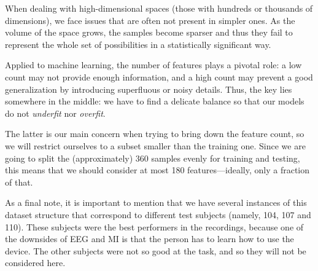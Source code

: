 	When dealing with high-dimensional spaces (those with hundreds or thousands of dimensions), we face issues that are often not present in simpler ones. As the volume of the space grows, the samples become sparser and thus they fail to represent the whole set of possibilities in a statistically significant way.

	Applied to machine learning, the number of features plays a pivotal role: a low count may not provide enough information, and a high count may prevent a good generalization by introducing superfluous or noisy details. Thus, the key lies somewhere in the middle: we have to find a delicate balance so that our models do not \textit{underfit} nor \textit{overfit}. 

\newpage

	The latter is our main concern when trying to bring down the feature count, so we will restrict ourselves to a subset smaller than the training one. Since we are going to split the (approximately) 360 samples evenly for training and testing, this means that we should consider at most 180 features---ideally, only a fraction of that.

	As a final note, it is important to mention that we have several instances of this dataset structure that correspond to different test subjects (namely, 104, 107 and 110). These subjects were the best performers in the recordings, because one of the downsides of \acs{EEG} and \acs{MI} is that the person has to learn how to use the device. The other subjects were not so good at the task, and so they will not be considered here.